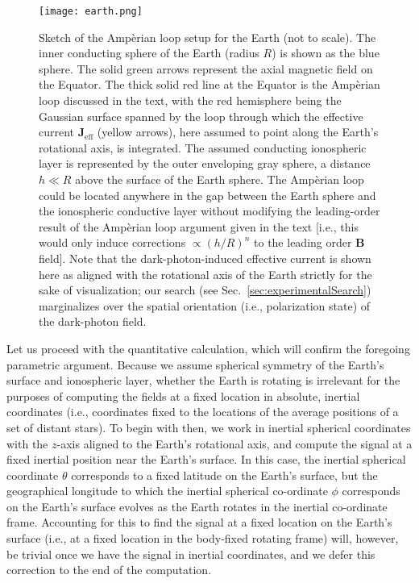 \documentclass[amsmath,amssymb,aps,10pt,prd,letterpaper,nofootinbib,balancelastpage,notitlepage,superscriptaddress,twocolumn,floatfix]{revtex4-2}
\newcommand{\secref}[2][]{Sec{#1}.~\ref{#2}}		%
\begin{document}
\begin{figure}[t]
\texttt{[image: earth.png]}
\caption{\label{fig:earth}%
    Sketch of the Amp\`erian loop setup for the Earth (not to scale).
    The inner conducting sphere of the Earth (radius $R$) is shown as the blue sphere.
    The solid green arrows represent the axial magnetic field on the Equator.
    The thick solid red line at the Equator is the Amp\`erian loop discussed in the text, with the red hemisphere being the Gaussian surface spanned by the loop through which the effective current $\bm{J}_{\text{eff}}$ (yellow arrows), here assumed to point along the Earth's rotational axis, is integrated.
    The assumed conducting ionospheric layer is represented by the outer enveloping gray sphere, a distance $h\ll R$ above the surface of the Earth sphere.
    The Amp\`erian loop could be located anywhere in the gap between the Earth sphere and the ionospheric conductive layer without modifying the leading-order result of the Amp\`erian loop argument given in the text [i.e., this would only induce corrections $\propto (h/R)^n$ to the leading order $\bm{B}$ field].
    Note that the dark-photon-induced effective current is shown here as aligned with the rotational axis of the Earth strictly for the sake of visualization; our search (see \secref{sec:experimentalSearch}) marginalizes over the spatial orientation (i.e., polarization state) of the dark-photon field.
    } 
\end{figure}

Let us proceed with the quantitative calculation, which will confirm the foregoing parametric argument.
Because we assume spherical symmetry of the Earth's surface and ionospheric layer, whether the Earth is rotating is irrelevant for the purposes of computing the fields at a fixed location in absolute, inertial coordinates (i.e., coordinates fixed to the locations of the average positions of a set of distant stars).
To begin with then, we work in inertial spherical coordinates with the $z$-axis aligned to the Earth's rotational axis, and compute the signal at a fixed inertial position near the Earth's surface. 
In this case, the inertial spherical coordinate $\theta$ corresponds to a fixed latitude on the Earth's surface, but the geographical longitude to which the inertial spherical co-ordinate $\phi$ corresponds on the Earth's surface evolves as the Earth rotates in the inertial co-ordinate frame.
Accounting for this to find the signal at a fixed location on the Earth's surface (i.e., at a fixed location in the body-fixed rotating frame) will, however, be trivial once we have the signal in inertial coordinates, and we defer this correction to the end of the computation.
\end{document}
